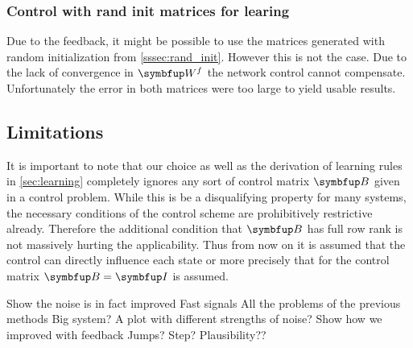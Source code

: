 
\subsubsection{Control with rand init matrices for learing}
Due to the feedback, it might be possible to use the matrices generated with random initialization from \cref{sssec:rand_init}. However this is not the case. Due to the lack of convergence in $\bmu{W}^f$ the network control cannot compensate. Unfortunately the error in both matrices were too large to yield usable results.\\






\subsection{Limitations}

It is important to note that our choice as well as the derivation of learning rules in \cref{sec:learning} completely ignores any sort of control matrix $\bmu{B}$ given in a control problem. While this is be a disqualifying property for many systems, the necessary conditions of the control scheme are prohibitively restrictive already. Therefore the additional condition that $\bmu{B}$ has full row rank is not massively hurting the applicability. Thus from now on it is assumed that the control can directly influence each state or more precisely that for the control matrix $\bmu{B} = \bmu{I}$ is assumed.


Show the noise is in fact improved
Fast signals
All the problems of the previous methods
Big system?
A plot with different strengths of noise? Show how we improved with feedback
Jumps? Step?
Plausibility??
